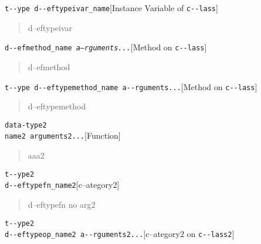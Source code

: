 \documentclass{book}
\begin{document}
\begin{titlepage}
\noindent\texttt{t{-}{-}ype d{-}{-}eftypeivar\_name}\hfill[Instance Variable of \texttt{c{-}{-}lass}]



%
\begin{quote}
\unskip{\parskip=0pt\noindent}%
d--eftypeivar
\end{quote}

\noindent\texttt{d{-}{-}efmethod\_name \EmbracOn{}\textnormal{\textsl{a--rguments...}}\EmbracOff{}}\hfill[Method on \texttt{c{-}{-}lass}]



%
\begin{quote}
\unskip{\parskip=0pt\noindent}%
d--efmethod
\end{quote}

\noindent\texttt{t{-}{-}ype d{-}{-}eftypemethod\_name a{-}{-}rguments...}\hfill[Method on \texttt{c{-}{-}lass}]



%
\begin{quote}
\unskip{\parskip=0pt\noindent}%
d--eftypemethod
\end{quote}


\noindent\texttt{data-type2\leavevmode{}\\name2 arguments2...}\hfill[Function]



%
\begin{quote}
\unskip{\parskip=0pt\noindent}%
aaa2
\end{quote}

\noindent\texttt{t{-}{-}ype2\leavevmode{}\\d{-}{-}eftypefn\_name2}\hfill[c--ategory2]



%
\begin{quote}
\unskip{\parskip=0pt\noindent}%
d--eftypefn no arg2
\end{quote}

\noindent\texttt{t{-}{-}ype2\leavevmode{}\\d{-}{-}eftypeop\_name2 a{-}{-}rguments2...}\hfill[c--ategory2 on \texttt{c{-}{-}lass2}]




\end{titlepage}
\end{document}

